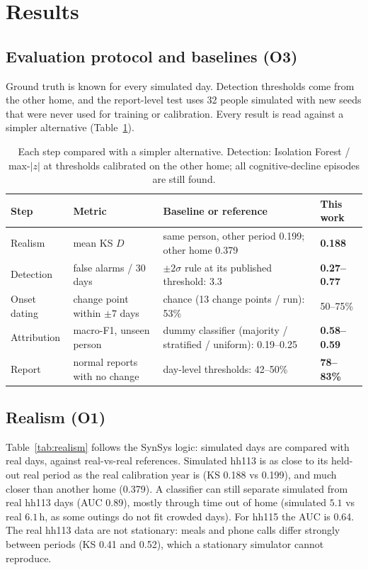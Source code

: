 \documentclass[10pt,a4paper]{article}
\begin{document}
\section{Results}
\subsection{Evaluation protocol and baselines (O3)}
Ground truth is known for every simulated day. Detection thresholds come from the other home, and the report-level test
uses 32 people simulated with new seeds that were never used for training or calibration. Every result is read against a
simpler alternative (Table~\ref{tab:baselines}).

\begin{table}[h]
\centering\small
\begin{tabular}{p{1.9cm}p{3.4cm}p{6.8cm}p{2.5cm}}
\toprule
Step & Metric & Baseline or reference & This work \\
\midrule
Realism & mean KS $D$ & same person, other period 0.199; other home 0.379 & \textbf{0.188} \\
Detection & false alarms / 30 days & $\pm2\sigma$ rule at its published threshold: 3.3 & \textbf{0.27--0.77} \\
Onset dating & change point within $\pm7$ days & chance (13 change points / run): 53\% & 50--75\% \\
Attribution & macro-F1, unseen person & dummy classifier (majority / stratified / uniform): 0.19--0.25 & \textbf{0.58--0.59} \\
Report & normal reports with no change & day-level thresholds: 42--50\% & \textbf{78--83\%} \\
\bottomrule
\end{tabular}
\caption{Each step compared with a simpler alternative. Detection: Isolation Forest / max-$|z|$ at thresholds calibrated
on the other home; all cognitive-decline episodes are still found.}
\label{tab:baselines}
\end{table}

\subsection{Realism (O1)}
Table~\ref{tab:realism} follows the SynSys logic: simulated days are compared with real days, against real-vs-real
references. Simulated hh113 is as close to its held-out real period as the real calibration year is (KS 0.188 vs 0.199),
and much closer than another home (0.379). A classifier can still separate simulated from real hh113 days (AUC 0.89),
mostly through time out of home (simulated $5.1$ vs real $6.1$\,h, as some outings do not fit crowded days). For hh115
the AUC is 0.64. The real hh113 data are not stationary: meals and phone calls differ strongly between periods (KS 0.41
and 0.52), which a stationary simulator cannot reproduce.
\end{document}
